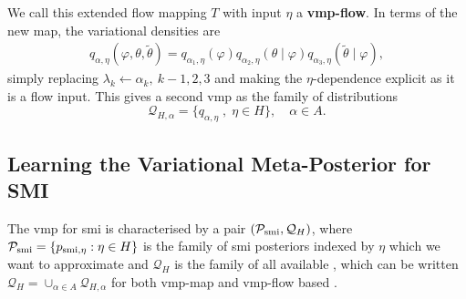 We call this extended flow mapping $T$ with input $\eta$ a {\bf \acrshort*{vmp}-flow}. In terms of the new map, the variational densities are
\begin{align}\label{eqn:q-lambda-smi-var-meta-new}
  q_{\alpha,\eta}(\varphi, \theta, \tilde\theta) =q_{\alpha_1,\eta}(\varphi)q_{\alpha_2,\eta}(\theta\mid \varphi)q_{\alpha_3,\eta}(\tilde\theta\mid \varphi),
\end{align}
simply replacing $\lambda_k\leftarrow\alpha_k,\ k-1,2,3$ and making the $\eta$-dependence explicit as it is a flow input. This gives a second
\acrlong*{vmp} as the family of distributions 
\[\mathcal{Q}_{H,\alpha} = \{ q_{\alpha,\eta} \;,\; \eta \in H \}, \quad\alpha\in A.\] 


\subsection{Learning the Variational Meta-Posterior for SMI}\label{subsec:learning_vmp_map}

The \acrlong*{vmp} for \acrshort*{smi} is characterised by a pair $(\mathcal{P}_{\operatorname{\text{smi}}}, \mathcal{Q}_H)$, where
$
\mathcal{P}_{\operatorname{\text{smi}}}=\{p_{\operatorname{\text{smi}},\eta}: \eta\in H\}
$
is the family of \acrshort*{smi} posteriors indexed by $\eta$ which we want to approximate and
$ \mathcal{Q}_{H}$ is the family of all available , which can be written $\mathcal{Q}_{H} = \cup_{\alpha\in A}  \mathcal{Q}_{H,\alpha}$
for both \acrshort*{vmp}-map and \acrshort*{vmp}-flow based .

 







